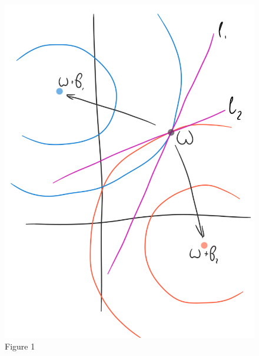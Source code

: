 \documentclass{article}
\begin{document}
\begin{figure}[b!]
	\centering
	\parbox{7cm}{
		\includegraphics[scale=0.25]{pics/battaglini03.png}
		\caption{Figure 1}
		\label{fig:1}
	}
	\qquad
	\parbox{7cm}{
}
\end{figure}
\end{document}
